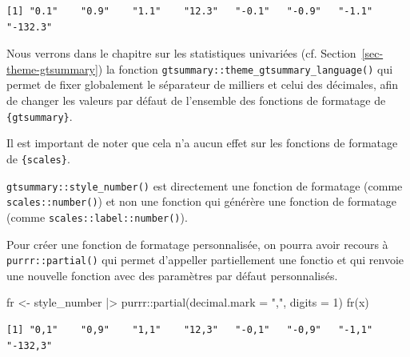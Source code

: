 \documentclass[
  letterpaper,
  DIV=11,
  numbers=noendperiod,
  oneside]{scrreprt}
\newenvironment{Shaded}{\begin{snugshade}}{\end{snugshade}}
\newcommand{\AttributeTok}[1]{\textcolor[rgb]{0.40,0.45,0.13}{#1}}
\newcommand{\DecValTok}[1]{\textcolor[rgb]{0.68,0.00,0.00}{#1}}
\newcommand{\FunctionTok}[1]{\textcolor[rgb]{0.28,0.35,0.67}{#1}}
\newcommand{\NormalTok}[1]{\textcolor[rgb]{0.00,0.23,0.31}{#1}}
\newcommand{\OtherTok}[1]{\textcolor[rgb]{0.00,0.23,0.31}{#1}}
\newcommand{\SpecialCharTok}[1]{\textcolor[rgb]{0.37,0.37,0.37}{#1}}
\newcommand{\StringTok}[1]{\textcolor[rgb]{0.13,0.47,0.30}{#1}}
\begin{document}
\begin{verbatim}
[1] "0.1"    "0.9"    "1.1"    "12.3"   "-0.1"   "-0.9"   "-1.1"   "-132.3"
\end{verbatim}

\begin{tcolorbox}[enhanced jigsaw, colbacktitle=quarto-callout-tip-color!10!white, opacityback=0, toprule=.15mm, colback=white, coltitle=black, bottomtitle=1mm, toptitle=1mm, titlerule=0mm, rightrule=.15mm, title=\textcolor{quarto-callout-tip-color}{\faLightbulb}\hspace{0.5em}{Astuce}, breakable, bottomrule=.15mm, opacitybacktitle=0.6, arc=.35mm, left=2mm, leftrule=.75mm, colframe=quarto-callout-tip-color-frame]

Nous verrons dans le chapitre sur les statistiques univariées (cf.
Section~\ref{sec-theme-gtsummary}) la fonction
\texttt{gtsummary::theme\_gtsummary\_language()} qui permet de fixer
globalement le séparateur de milliers et celui des décimales, afin de
changer les valeurs par défaut de l'ensemble des fonctions de formatage
de \texttt{\{gtsummary\}}.

Il est important de noter que cela n'a aucun effet sur les fonctions de
formatage de \texttt{\{scales\}}.

\end{tcolorbox}

\begin{tcolorbox}[enhanced jigsaw, colbacktitle=quarto-callout-caution-color!10!white, opacityback=0, toprule=.15mm, colback=white, coltitle=black, bottomtitle=1mm, toptitle=1mm, titlerule=0mm, rightrule=.15mm, title=\textcolor{quarto-callout-caution-color}{\faFire}\hspace{0.5em}{Mise en garde}, breakable, bottomrule=.15mm, opacitybacktitle=0.6, arc=.35mm, left=2mm, leftrule=.75mm, colframe=quarto-callout-caution-color-frame]

\texttt{gtsummary::style\_number()} est directement une fonction de
formatage (comme \texttt{scales::number()}) et non une fonction qui
générère une fonction de formatage (comme
\texttt{scales::label::number()}).

Pour créer une fonction de formatage personnalisée, on pourra avoir
recours à \texttt{purrr::partial()} qui permet d'appeller partiellement
une fonctio et qui renvoie une nouvelle fonction avec des paramètres par
défaut personnalisés.

\begin{Shaded}
\begin{Highlighting}[]
\NormalTok{fr }\OtherTok{\textless{}{-}}\NormalTok{ style\_number }\SpecialCharTok{|\textgreater{}}
\NormalTok{  purrr}\SpecialCharTok{::}\FunctionTok{partial}\NormalTok{(}\AttributeTok{decimal.mark =} \StringTok{","}\NormalTok{, }\AttributeTok{digits =} \DecValTok{1}\NormalTok{)}
\FunctionTok{fr}\NormalTok{(x)}
\end{Highlighting}
\end{Shaded}

\begin{verbatim}
[1] "0,1"    "0,9"    "1,1"    "12,3"   "-0,1"   "-0,9"   "-1,1"   "-132,3"
\end{verbatim}

\end{tcolorbox}
\end{document}
